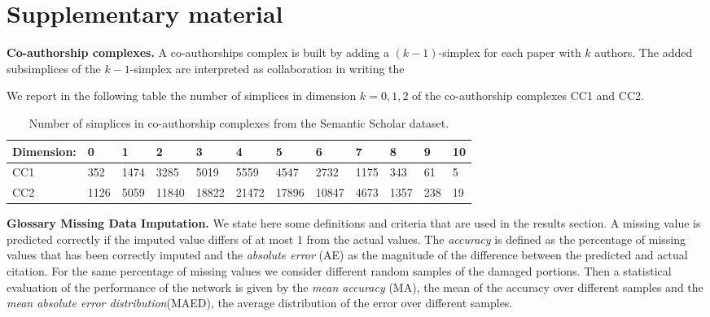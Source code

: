 \section{Supplementary material}\label{sec:supp_material}

\textbf{Co-authorship complexes.} A co-authorships complex is built by adding a $(k-1)$-simplex for each paper with $k$ authors. The added subsimplices of the $k-1$-simplex are interpreted as collaboration in writing the

We report in the following table the number of simplices in dimension $k=0,1,2$ of the co-authorship complexes CC1 and CC2.
\begin{table}[htbp]
  \centering
  \scriptsize{
  \begin{tabular}{llllllllllll}
    \cmidrule(r){1-12}
    Dimension:   & 0     & 1  & 2     & 3 & 4     & 5 & 6    & 7 & 8   & 9 & 10\\
    \midrule
    CC1 & 352  & 1474  & 3285  & 5019  & 5559  & 4547  & 2732  & 1175  & 343 & 61 & 5\\
    CC2 & 1126 & 5059 & 11840 & 18822 & 21472 & 17896  & 10847 & 4673 & 1357 & 238 & 19\\ 
    \bottomrule
  \end{tabular}}
  \vspace{2pt}
  \caption{%
  Number of simplices in co-authorship complexes from the Semantic Scholar dataset.
  } \label{table:Simplices-coauthor}
\end{table}

\textbf{Glossary Missing Data Imputation.} We state here some definitions and criteria that are used in the results section. 
A missing value is predicted correctly if the imputed value differs of at most $1$ from the actual values. 
The \emph{accuracy} is defined as the percentage of missing values that has been correctly imputed and the \emph{absolute error} (AE) as the magnitude of the difference between the predicted and actual citation.
For the same percentage of missing values we consider different random samples of the damaged portions. Then a statistical evaluation of the performance of the network is given by the \emph{mean accuracy} (MA), the mean of the accuracy over different samples and the \emph{mean absolute error distribution}(MAED), the average distribution of the error over different samples.
